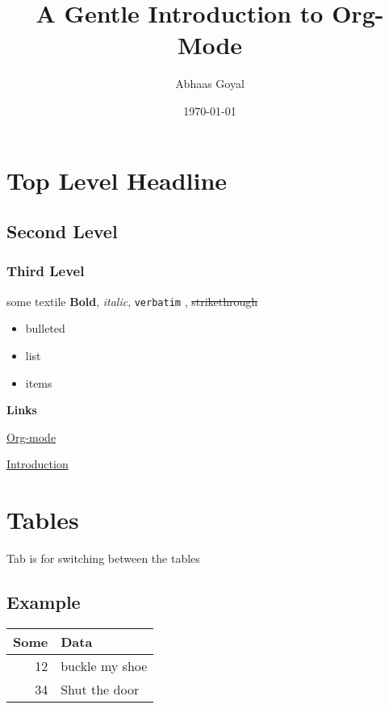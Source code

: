 \documentclass[11pt]{article}
\author{Abhaas Goyal}
\date{\today}
\title{A Gentle Introduction to Org-Mode}
\begin{document}
\maketitle
\tableofcontents

\section{Top Level Headline}
\label{sec:orge15bc88}
\subsection{Second Level}
\label{sec:org3c2ff12}
\subsubsection{Third Level}
\label{sec:org43baba8}
some textile
\textbf{Bold}, \emph{italic}, \texttt{verbatim} , \sout{strikethrough}
\begin{itemize}
\item bulleted
\item list
\item items
\end{itemize}

\textbf{Links}

\href{http://orgmode.org/}{Org-mode}

\href{consistentDoc.org}{Introduction}

\section{Tables}
\label{sec:org1b53c33}
Tab is for switching between the tables
\subsection{Example}
\label{sec:org709ad02}
\begin{center}
\begin{tabular}{rl}
Some & Data\\
\hline
12 & buckle my shoe\\
34 & Shut the door\\
\end{tabular}
\end{center}
\end{document}
